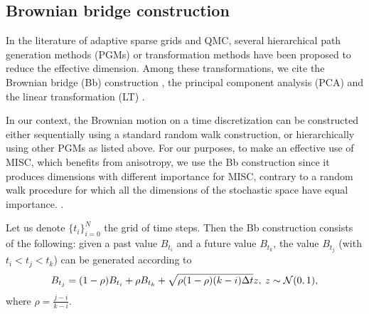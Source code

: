 \subsection{Brownian bridge construction}\label{sec:Brwonian bridge construction}
In the literature of adaptive sparse grids and  QMC, several hierarchical path generation methods (PGMs) or transformation methods have been proposed to reduce the effective dimension. Among these transformations, we cite  the Brownian bridge (Bb)  construction \cite{morokoff1994quasi,moskowitz1996smoothness,caflisch1997valuation}, the principal component analysis (PCA)  \cite{acworth1998comparison} and the linear transformation (LT) \cite{imai2004minimizing}.

In our context, the Brownian motion on a time discretization  can be constructed either sequentially using a standard random walk construction, or hierarchically using   other PGMs as listed above. For our purposes, to make an effective use of MISC, which benefits from anisotropy, we use the Bb construction since it produces  dimensions with different importance for MISC, contrary to a random walk procedure for which all the dimensions of the stochastic space have equal importance. .

Let us denote $\{t_i\}_{i=0}^{N}$ the grid of time steps. Then the Bb construction \cite{glasserman2004monte} consists of the following: given a past value $B_{t_i}$ and a future value $B_{t_k}$, the value $B_{t_j}$ (with $t_i < t_j < t_k$) can be generated according to 
\begin{equation*}
B_{t_j}=(1-\rho) B_{t_i}+\rho B_{t_k}+ \sqrt{\rho (1-\rho)(k-i) \Delta t} z, \: z \sim \mathcal{N}(0,1) ,
\end{equation*}
where $\rho=\frac{j-i}{k-i}$.  





